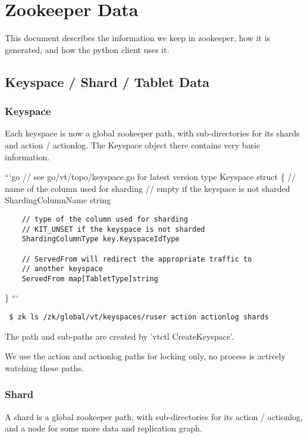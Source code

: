 
\section{Zookeeper Data}\hypertarget{zookeeper-data}{}\label{zookeeper-data}

This document describes the information we keep in zookeeper, how it is generated, and how the python client uses it.

\subsection{Keyspace / Shard / Tablet Data}\hypertarget{keyspace--shard--tablet-data}{}\label{keyspace--shard--tablet-data}

\subsubsection{Keyspace}\hypertarget{keyspace}{}\label{keyspace}

Each keyspace is now a global zookeeper path, with sub-directories for its shards and action / actionlog. The Keyspace
object there contains very basic information.

```go
// see go/vt/topo/keyspace.go for latest version
type Keyspace struct \{
        // name of the column used for sharding
        // empty if the keyspace is not sharded
        ShardingColumnName string

\begin{verbatim}    // type of the column used for sharding
    // KIT_UNSET if the keyspace is not sharded
    ShardingColumnType key.KeyspaceIdType

    // ServedFrom will redirect the appropriate traffic to
    // another keyspace
    ServedFrom map[TabletType]string
\end{verbatim}
\}
```

{\tt 
\$ zk ls /zk/global/vt/keyspaces/ruser
action
actionlog
shards
}

The path and sub-paths are created by 'vtctl CreateKeyspace'.

We use the action and actionlog paths for locking only, no process is actively watching these paths.

\subsubsection{Shard}\hypertarget{shard}{}\label{shard}

A shard is a global zookeeper path, with sub-directories for its action / actionlog, and a node for some more data and replication graph.

